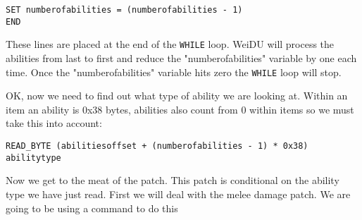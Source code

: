 \documentclass{article}
\def\ttref#1{\ahrefloc{#1}{\tt #1}}
\def\t#1{{\tt #1}}
\begin{document}
\begin{verbatim}
SET numberofabilities = (numberofabilities - 1)
END
\end{verbatim}
These lines are placed at the end of the \t{WHILE} loop. WeiDU will
process the abilities from last to first and reduce the "numberofabilities"
variable by one each time. Once the "numberofabilities" variable hits zero the
\t{WHILE} loop will stop.

OK, now we need to find out what type of ability we are looking at. Within
an item an ability is 0x38 bytes, abilities also count from 0 within items
so we must take this into account:
\begin{verbatim}
READ_BYTE (abilitiesoffset + (numberofabilities - 1) * 0x38) abilitytype
\end{verbatim}
Now we get to the meat of the patch. This patch is conditional on the
ability type we have just read. First we will deal with the melee damage
patch. We are going to be using a \ttref{PATCH!IF} command to do this
\end{document}
